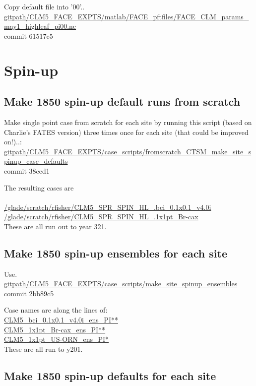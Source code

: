 \documentclass{article}
\begin{document}
Copy default file into '00'..\\
{\color{red}\small{\url{gitpath/CLM5_FACE_EXPTS/matlab/FACE_pftfiles/FACE_CLM_params_may1_highleaf_pi00.nc }}} \\
commit 61517c5 

\section{Spin-up}
\subsection{Make 1850 spin-up default runs from scratch}
Make single point case from scratch for each site by running this script (based on Charlie's FATES version) three times once for each site (that could be improved on!)..:\\
{\color{blue}\small{\url{gitpath/CLM5_FACE_EXPTS/case_scripts/fromscratch_CTSM_make_site_spinup_case_defaults}}}\\
commit 38ced1 


The resulting cases are \\
{\\
\small{\url{/glade/scratch/rfisher/CLM5_SPR_SPIN_HL_.bci_0.1x0.1_v4.0i}}\\
\small{\url{/glade/scratch/rfisher/CLM5_SPR_SPIN_HL_.1x1pt_Br-cax}}}\\

These are all run out to year 321. 

\subsection{Make 1850 spin-up ensembles for each site}

Use.\\
{\color{blue}\small{\url{gitpath/CLM5_FACE_EXPTS/case_scripts/make_site_spinup_ensembles}} }\\
commit 2bb89c5

Case names are along the lines of:\\
{\color{cyan}\small{\url{CLM5_bci_0.1x0.1_v4.0i_ens_PI**}}\\
\small{\url{CLM5_1x1pt_Br-cax_ens_PI**}}\\
\small{\url{CLM5_1x1pt_US-ORN_ens_PI*}}}\\

These are all run to y201. 

\subsection{Make 1850 spin-up defaults for each site}
\end{document}
